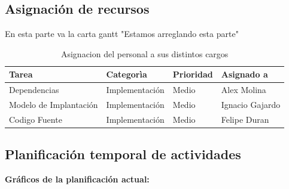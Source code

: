 \subsection{Asignación de recursos}
En esta parte va la carta gantt
"Estamos arreglando esta parte"

\begin{table}[H]
    \begin{center}
        \begin{tabular}{| m{6cm} | m{3cm} | m{2cm} | m{4cm} |}        
        	\hline 
        	Tarea & Categorìa & Prioridad & Asignado a\\
        	\hline
        	Dependencias & Implementación & Medio & Alex Molina\\
        	\hline
        	Modelo de Implantación & Implementación & Medio & Ignacio Gajardo\\
        	\hline
        	Codigo Fuente & Implementación & Medio & Felipe Duran\\
        	\hline
        \end{tabular}
    \caption{Asignacion del personal a sus distintos cargos}
    \end{center}
\end{table}
\subsection{Planificación temporal de actividades}
\textbf{Gráficos de la planificación actual:}

